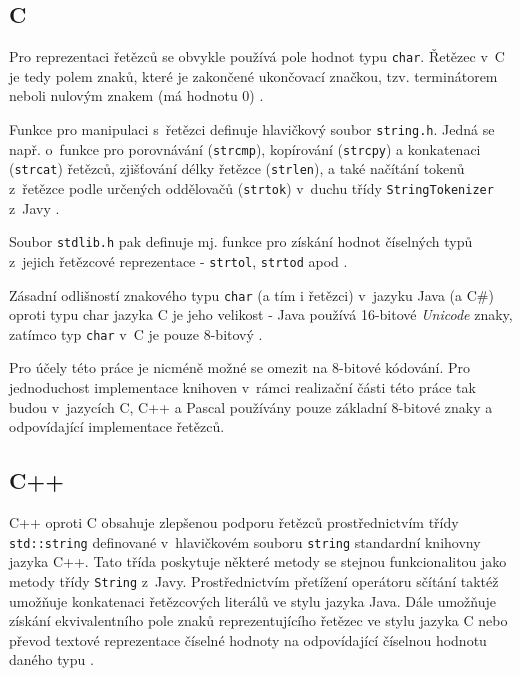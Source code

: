 \documentclass[onepage, a4paper, 12pt]{bakalarka}
\begin{document}
\subsection{C}
Pro reprezentaci řetězců se obvykle používá pole hodnot typu \texttt{char}. Řetězec v~C je tedy polem znaků, které je zakončené ukončovací značkou, tzv. terminátorem neboli nulovým znakem (má hodnotu 0) \cite{cpp-guide-chararray}.\par
Funkce pro manipulaci s~řetězci definuje hlavičkový soubor \texttt{string.h}. Jedná se např. o~funkce pro porovnávání (\texttt{strcmp}), kopírování (\texttt{strcpy}) a konkatenaci (\texttt{strcat}) řetězců, zjišťování délky řetězce (\texttt{strlen}), a také načítání tokenů z~řetězce podle určených oddělovačů (\texttt{strtok}) v~duchu třídy \texttt{StringTokenizer} z~Javy \cite{cpp-guide-cstring}.\par
Soubor \texttt{stdlib.h} pak definuje mj. funkce pro získání hodnot číselných typů z~jejich řetězcové reprezentace - \texttt{strtol}, \texttt{strtod} apod \cite{cpp-guide-cstdlib}.\par
Zásadní odlišností znakového typu \texttt{char} (a tím i řetězci) v~jazyku Java (a C\#) oproti typu char jazyka C je jeho velikost - Java používá 16-bitové \textit{Unicode} znaky, zatímco typ \texttt{char} v~C je pouze 8-bitový \cite{cpp-guide-types}.\par
Pro účely této práce je nicméně možné se omezit na 8-bitové kódování. Pro jednoduchost implementace knihoven v~rámci realizační části této práce tak budou v~jazycích C, C++ a Pascal používány pouze základní 8-bitové znaky a odpovídající implementace řetězců.

\subsection{C++}
C++ oproti C obsahuje zlepšenou podporu řetězců prostřednictvím třídy \texttt{std::string} definované v~hlavičkovém souboru \texttt{string} standardní knihovny jazyka C++. Tato třída poskytuje některé metody se stejnou funkcionalitou jako metody třídy \texttt{String} z~Javy. Prostřednictvím přetížení operátoru sčítání taktéž umožňuje konkatenaci řetězcových literálů ve stylu jazyka Java. Dále umožňuje získání ekvivalentního pole znaků reprezentujícího řetězec ve stylu jazyka C nebo převod textové reprezentace číselné hodnoty na odpovídající číselnou hodnotu daného typu \cite{cpp-guide-string, cpp-guide-stdstring}.
\end{document}
